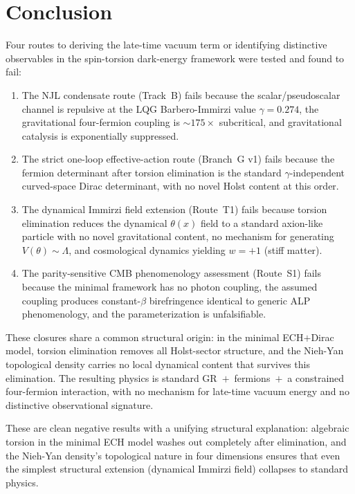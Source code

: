 \documentclass[11pt,letterpaper]{article}
\newcommand{\BI}{\gamma}               %
\begin{document}
\section{Conclusion}\label{sec:conclusion}

Four routes to deriving the late-time vacuum term or identifying distinctive
observables in the spin-torsion dark-energy framework were tested and found
to fail:
\begin{enumerate}
  \item The NJL condensate route (Track~B) fails because the
    scalar/pseudoscalar channel is repulsive at the LQG Barbero-Immirzi value
    $\BI=0.274$, the gravitational four-fermion coupling is ${\sim}175\times$
    subcritical, and gravitational catalysis is exponentially suppressed.
  \item The strict one-loop effective-action route (Branch~G v1) fails because
    the fermion determinant after torsion elimination is the standard
    $\BI$-independent curved-space Dirac determinant, with no novel Holst
    content at this order.
  \item The dynamical Immirzi field extension (Route~T1) fails because torsion
    elimination reduces the dynamical $\theta(x)$ field to a standard
    axion-like particle with no novel gravitational content, no mechanism for
    generating $V(\theta)\sim\Lambda$, and cosmological dynamics yielding
    $w=+1$ (stiff matter).
  \item The parity-sensitive CMB phenomenology assessment (Route~S1) fails
    because the minimal framework has no photon coupling, the assumed coupling
    produces constant-$\beta$ birefringence identical to generic ALP
    phenomenology, and the parameterization is unfalsifiable.
\end{enumerate}

These closures share a common structural origin: in the minimal ECH$+$Dirac
model, torsion elimination removes all Holst-sector structure, and the
Nieh-Yan topological density carries no local dynamical content that survives
this elimination. The resulting physics is standard GR~$+$~fermions~$+$~a
constrained four-fermion interaction, with no mechanism for late-time vacuum
energy and no distinctive observational signature.

These are clean negative results with a unifying structural explanation:
algebraic torsion in the minimal ECH model washes out completely after
elimination, and the Nieh-Yan density's topological nature in four dimensions
ensures that even the simplest structural extension (dynamical Immirzi field)
collapses to standard physics.
\end{document}
